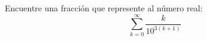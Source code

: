\begin{ejercicio}
    Encuentre una fracción que represente al número real:
    \begin{equation*}
        \sum_{k=0}^{\infty} \dfrac{k}{10^{3(k+1)}}
    \end{equation*}
\begin{comment}

    De forma general, sea $\alpha\in \bb{R},~\alpha\neq 1$, y consideramos la recurrencia dada por:
    \begin{equation*}
        \left\{\begin{array}{l}
            s_0 = 0 \\
            s_n = s_{n-1} + n\alpha^n
        \end{array}\right.
    \end{equation*}

    El orden de la recurrencia es $k=1$. La ecuación característica es:
    \begin{equation*}
        x - 1 = 0 \Longrightarrow x = 1
    \end{equation*}

    Por tanto, la solución de la parte homogénea de la recurrencia es:
    \begin{equation*}
        x_n^{(h)} = c_1
    \end{equation*}

    La función de ajuste es $f(n) = n\alpha^n$. Por lo visto en teoría, tenemos que
    una solución particular de la recurrencia es:
    \begin{equation*}
        x_n^{(p)} = (c_2 + c_3n)\alpha^n
    \end{equation*}

    Como $x_n^{(p)}$ es solución de la recurrencia, entonces:
    \begin{align*}
        \alpha n\alpha^{n-1} &=n\alpha^n = x_n^{(p)} - x_{n-1}^{(p)} = (c_2 + c_3n)\alpha^n - (c_2 + c_3(n-1))\alpha^{n-1} =\\
        &= c_2\alpha^n + c_3n\alpha^n - c_2\alpha^{n-1} - c_3n\alpha^{n-1} + c_3\alpha^{n-1} =\\
        &= c_2\alpha^{n-1}(\alpha-1) + c_3\alpha^{n-1} +c_3n\alpha^{n-1}(\alpha-1)
    \end{align*}

    Por tanto, tenemos el siguiente sistema de ecuaciones:
    \begin{equation*}
        \left\{\begin{array}{l}
            c_3(\alpha-1) = \alpha \Longrightarrow c_3 = \dfrac{\alpha}{\alpha-1}\\
            c_2(\alpha-1) + c_3 = 0 \Longrightarrow c_2 = \dfrac{-c_3}{\alpha-1} = \dfrac{-\alpha}{(\alpha-1)^2}
        \end{array}\right.
    \end{equation*}


\end{comment}
\end{ejercicio}

